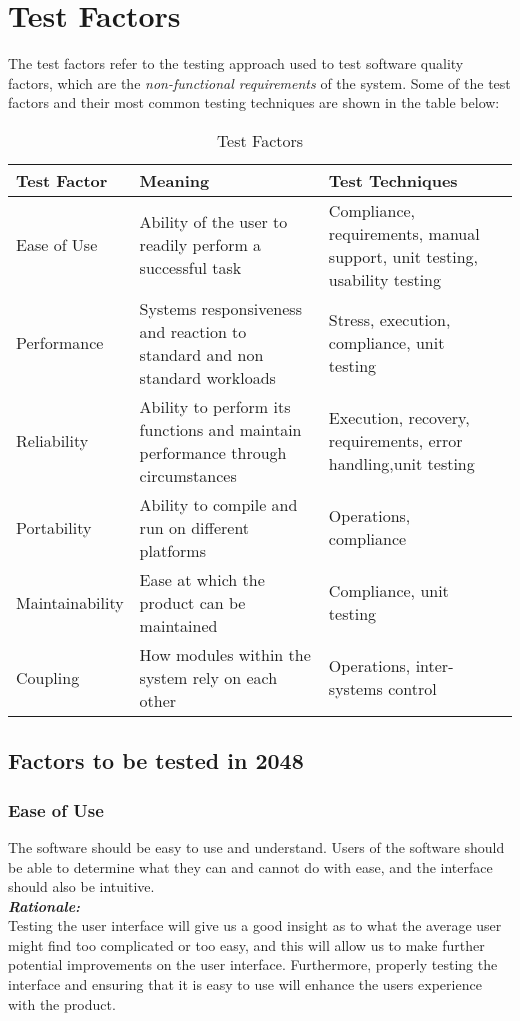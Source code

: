 \documentclass[12pt]{article}
\begin{document}
\section{Test Factors}
The test factors refer to the testing approach used to test software quality 
factors, which are the \emph{non-functional requirements} of the system. Some 
of the test factors and their most common testing techniques are shown in the 
table below:
\begin{table}[!htbp]
	\centering
	\begin{tabular}{ | l |p{5cm}|p{5cm}| l | |}
		\hline
		Test Factor & Meaning & Test Techniques \\ \hline
		Ease of Use & Ability of the user to readily perform a successful task 
		& Compliance, requirements, manual support, unit testing, usability 
		testing \\ \hline
		Performance & Systems responsiveness and reaction to standard and non 
		standard workloads & Stress, execution, compliance, unit testing \\
		\hline
		Reliability & Ability to perform its functions and maintain performance 
		through circumstances & Execution, recovery, requirements, error 		
		handling,unit testing  \\ \hline
		Portability & Ability to compile and run on different platforms &  
		Operations, compliance \\ \hline
		Maintainability & Ease at which the product can be maintained & 		
		Compliance, unit testing \\ \hline 
		Coupling & How modules within the system rely on each other & 
		Operations, inter-systems control \\ 
		\hline
	\end{tabular}
	\caption{Test Factors}
\end{table}

\subsection{Factors to be tested in 2048}
\subsubsection{Ease of Use}
The software should be easy to use and understand. Users of the software should 
be able to determine what they can and cannot do with ease, and the interface 
should also be intuitive.\\

\textbf{\emph{Rationale:}}\\
Testing the user interface will give us a good insight as to what the average 
user might find too complicated or too easy, and this will allow us to make 
further potential improvements on the user interface. Furthermore, properly 
testing the interface and ensuring that it is easy to use will enhance the 
users experience with the product. \\
\end{document}
